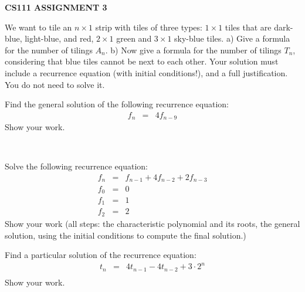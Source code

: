 \documentclass{article}
\begin{document}
\centerline{\large \bf CS111 ASSIGNMENT 3 }

\vskip 0.2in


\vskip 0.1in



\begin{problem}
We want to tile an $n\times 1$ strip with tiles of three types: $1\times 1$ tiles that are dark-blue, light-blue, and red, $2\times 1$ green and $3\times 1$ sky-blue tiles. a) Give a formula for the number of tilings $A_n$. b) Now give a formula for the number of tilings $T_n$, considering that blue tiles cannot be next to each other. Your solution must include a recurrence equation (with initial conditions!), and a full justification. You do not need to solve it. 

\end{problem}



\begin{problem}
Find the general solution of the following recurrence equation:
%
\begin{eqnarray*}
        f_n &=& 4f_{n-9}
\end{eqnarray*}
Show your work.

\end{problem}
%
\
\begin{problem} Solve the following recurrence equation:
\begin{eqnarray*}
        f_n &=& f_{n-1} + 4f_{n-2} + 2f_{n-3}\\
        f_0 &=& 0 \\
        f_1 &=& 1 \\
		f_2 &=& 2 
\end{eqnarray*}
%
Show your work (all steps: 
the characteristic polynomial and its
roots, the general solution, 
using the initial conditions to compute the final solution.)
\end{problem}
%

\begin{problem}
Find a particular solution of the recurrence equation:
%
\begin{eqnarray*}
        t_n &=& 4t_{n-1} - 4t_{n-2} + 3\cdot 2^n\\
\end{eqnarray*}
%
Show your work.
%
\end{problem}
\end{document}
